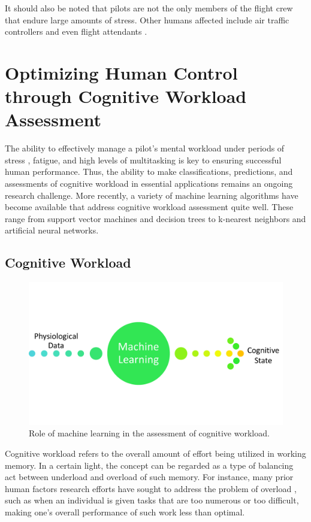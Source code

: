 \documentclass[12pt]{uthesis-v12}  %
\begin{document}
It should also be noted that pilots are not the only members of the flight crew that endure large amounts of stress. Other humans affected include air traffic controllers \cite{mfunke,duley,abbass,chatterji,brookings,gianazza} and even flight attendants \cite{kelleher}. 

\section{Optimizing Human Control through Cognitive Workload Assessment}

The ability to effectively manage a pilot's mental workload under periods of stress \cite{sanders, hockey, mendl}, fatigue, and high levels of multitasking is key to ensuring successful human performance. Thus, the ability to make classifications, predictions, and assessments of cognitive workload in essential applications remains an ongoing research challenge. More recently, a variety of machine learning algorithms have become available that address cognitive workload assessment quite well. These range from support vector machines and decision trees to k-nearest neighbors and artificial neural networks.

\subsection{Cognitive Workload}

\begin{figure}[!t]
\centering
\includegraphics[width=6in]{cw}
\caption{Role of machine learning in the assessment of cognitive workload.}
\label{challenges}
\end{figure}

Cognitive workload refers to the overall amount of effort being utilized in working memory. In a certain light, the concept can be regarded as a type of balancing act between underload and overload of such memory. For instance, many prior human factors research efforts have sought to address the problem of overload \cite{berka}, such as when an individual is given tasks that are too numerous or too difficult, making one's overall performance of such work less than optimal. 
\end{document}
